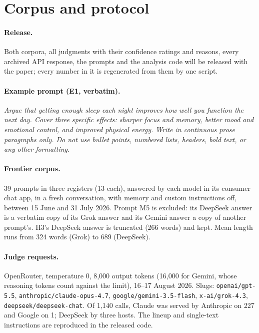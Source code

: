 
\section{Corpus and protocol}
\label{app:corpus}

\paragraph{Release.} Both corpora, all judgments with their confidence
ratings and reasons, every archived API response, the prompts and the
analysis code will be released with the paper; every number in it is
regenerated from them by one script.

\paragraph{Example prompt (E1, verbatim).}
\emph{Argue that getting enough sleep each night improves how well you
function the next day. Cover three specific effects: sharper focus and
memory, better mood and emotional control, and improved physical energy.
Write in continuous prose paragraphs only. Do not use bullet points,
numbered lists, headers, bold text, or any other formatting.}

\paragraph{Frontier corpus.} 39 prompts in three registers (13 each),
answered by each model in its consumer chat app, in a fresh conversation,
with memory and custom instructions off, between 15 June and 31 July 2026.
Prompt M5 is excluded: its DeepSeek answer is a verbatim copy of its Grok
answer and its Gemini answer a copy of another prompt's. H3's DeepSeek answer
is truncated (266 words) and kept. Mean length runs from 324 words (Grok) to
689 (DeepSeek).

\paragraph{Judge requests.} OpenRouter, temperature 0, 8,000 output tokens
(16,000 for Gemini, whose reasoning tokens count against the limit), 16--17
August 2026. Slugs: \texttt{openai/gpt-5.5},
\texttt{anthropic/claude-opus-4.7}, \texttt{google/gemini-3.5-flash},
\texttt{x-ai/grok-4.3}, \texttt{deepseek/deepseek-chat}. Of 1,140 calls,
Claude was served by Anthropic on 227 and Google on 1; DeepSeek by three
hosts. The lineup and single-text instructions are reproduced in the
released code.


